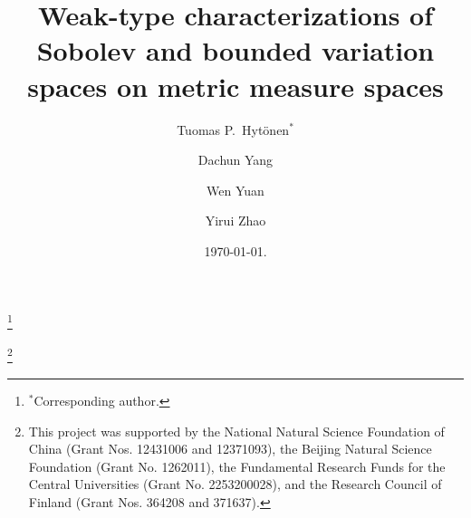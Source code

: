 \documentclass[11pt]{amsart}
\theoremstyle{definition}
\theoremstyle{remark}
\numberwithin{equation}{section}
\begin{document}
\title[Sobolev and BV spaces on metric measure spaces]
{Weak-type characterizations of Sobolev and bounded variation spaces on metric measure spaces}


\author[T. P. Hyt\"onen]{Tuomas P.\ Hyt\"onen$^*$}
\address{Department of Mathematics and Systems Analysis, Aalto University, P.O. Box 11100
(Otakaari~1), \mbox{FI-00076} Aalto, Finland}
\curraddr{}

\thanks{$^*$Corresponding author.}

\author[D. Yang]{Dachun Yang}
\address{Laboratory of Mathematics and Complex Systems (Ministry of Education of China),
School of Mathematical Sciences, Institute for Advanced Study,
Beijing Normal University, Beijing 100875, The People's Republic of China}
\curraddr{}


\author[W. Yuan]{Wen Yuan}
\address{Laboratory of Mathematics and Complex Systems (Ministry of Education of China),
School of Mathematical Sciences, Beijing Normal University, Beijing 100875, The People's
Republic of China}
\curraddr{}

\author[Y. Zhao]{Yirui Zhao}
\address{Laboratory of Mathematics and Complex Systems (Ministry of Education of China),
School of Mathematical Sciences, Beijing Normal University, Beijing 100875, The People's
Republic of China}
\curraddr{}


\thanks{This project was supported by
the National Natural Science Foundation of China
(Grant Nos. 12431006 and 12371093), the Beijing Natural Science
Foundation (Grant No. 1262011), the Fundamental Research Funds
for the Central Universities (Grant No. 2253200028),
and the Research Council of Finland (Grant Nos. 364208 and 371637).}

\date{\today.}

\renewcommand{\subjclassname}{\textup{2020} Mathematics Subject Classification}


\end{document}
